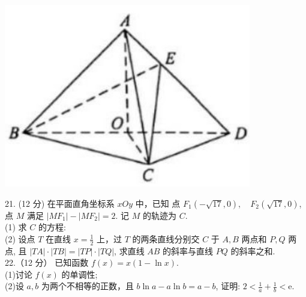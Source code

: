 \documentclass[UTF8]{ctexart}
\begin{document}
\begin{center}
	\includegraphics[width=0.35\linewidth]{a/T20}
\end{center}

	\newpage
	
	21. (12 分)
	在平面直角坐标系 $x O y$ 中，已知 点 $F_{1}(-\sqrt{17}, 0), \quad F_{2}(\sqrt{17}, 0)$, 点 $M$ 满足
	$\left|M F_{1}\right|-\left|M F_{2}\right|=2$. 记 $M$ 的轨迹为 $C$.\\
	
	(1) 求 $C$ 的方程:\\
	
	(2) 设点 $T$ 在直线 $x=\displaystyle{\frac{1}{2}}$ 上，过 $T$ 的两条直线分别交 $C$ 于 $A, B$ 两点和 $P, Q$ 两点,
	且 $|T A| \cdot|T B|=|T P| \cdot|T Q|$, 求直线 $A B$ 的斜率与直线 $P Q$ 的斜率之和.\\
	
	22.（12 分）
	已知函数 $f(x)=x(1-\ln x)$.\\
	
	(1)讨论 $f(x)$ 的单调性;\\
	
	(2)设 $a, b$ 为两个不相等的正数，且 $b \ln a-a \ln b=a-b$, 证明: $2<\displaystyle{\frac{1}{a}}+\displaystyle{\frac{1}{b}}<\mathrm{e} .$

	
\end{document}
